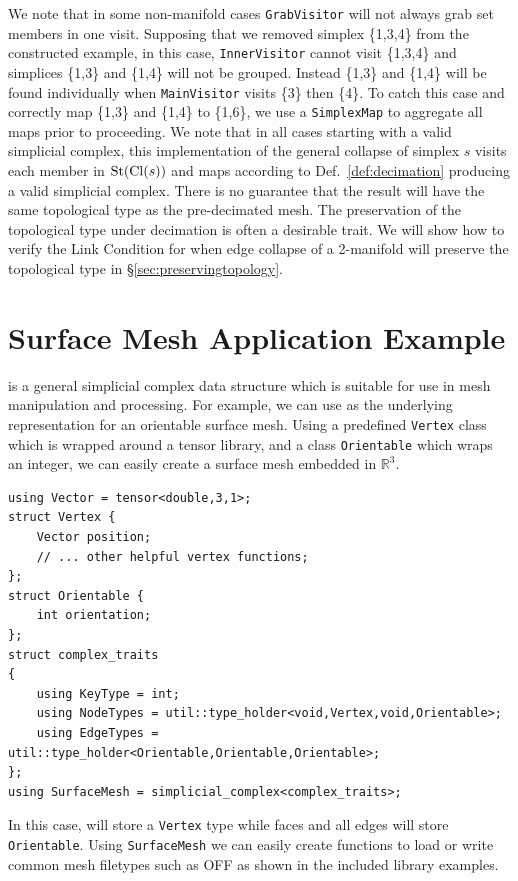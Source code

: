 		\par We note that in some non-manifold cases \verb|GrabVisitor| will not always grab set members in one visit.
		Supposing that we removed simplex \{1,3,4\} from the constructed example, in this case, \verb|InnerVisitor| cannot visit \{1,3,4\} and simplices \{1,3\} and \{1,4\} will not be grouped.
		Instead \{1,3\} and \{1,4\} will be found individually when \verb|MainVisitor| visits \{3\} then \{4\}.
		To catch this case and correctly map \{1,3\} and \{1,4\} to \{1,6\}, we use a \verb|SimplexMap| to aggregate all maps prior to proceeding.
		We note that in all cases starting with a valid simplicial complex, this implementation of the general collapse of simplex $s$ visits each member in $\operatorname{St}(\operatorname{Cl}(s))$ and maps according to Def.~\ref{def:decimation} producing a valid simplicial complex.
		There is no guarantee that the result will have the same topological type as the pre-decimated mesh.
		The preservation of the topological type under decimation is often a desirable trait.
		We will show how to verify the Link Condition for when edge collapse of a 2-manifold will preserve the topological type in \S\ref{sec:preservingtopology}.

\section{Surface Mesh Application Example}\label{sec:applications}

\par \asc is a general simplicial complex data structure which is suitable for use in mesh manipulation and processing. For example, we can use \asc as the underlying representation for an orientable surface mesh. Using a predefined \verb|Vertex| class which is wrapped around a tensor library, and a class \verb|Orientable| which wraps an integer, we can easily create a surface mesh embedded in $\mathbb{R}^3$.
\begin{lstlisting}
using Vector = tensor<double,3,1>;
struct Vertex {
	Vector position;
	// ... other helpful vertex functions;
};
struct Orientable {
	int orientation;
};
struct complex_traits
{
    using KeyType = int;
    using NodeTypes = util::type_holder<void,Vertex,void,Orientable>;
    using EdgeTypes = util::type_holder<Orientable,Orientable,Orientable>;
};
using SurfaceMesh = simplicial_complex<complex_traits>;
\end{lstlisting}
In this case,  will store a \verb|Vertex| type while faces and all edges will store \verb|Orientable|. Using \verb|SurfaceMesh| we can easily create functions to load or write common mesh filetypes such as OFF as shown in the included library examples.

